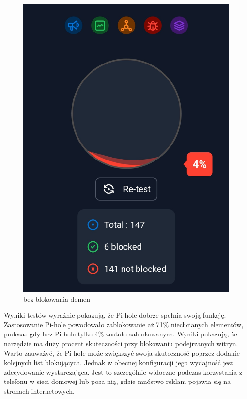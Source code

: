 \documentclass{article}
\begin{document}
\begin{figure}[H]
\begin{minipage}{0.5\textwidth}
    \includegraphics[scale=0.2]{bezBloka1.jpg}
    \caption{bez blokowania domen}
  \end{minipage}
\end{figure}

Wyniki testów wyraźnie pokazują, że Pi-hole dobrze spełnia swoją funkcję. Zastosowanie Pi-hole powodowało zablokowanie aż 71\% niechcianych elementów, podczas gdy bez Pi-hole tylko 4\% zostało zablokowanych. Wyniki pokazują, że narzędzie ma duży procent skuteczności przy blokowaniu podejrzanych witryn.\\

Warto zauważyć, że Pi-hole może zwiększyć swoja skuteczność poprzez dodanie kolejnych list blokujących. Jednak w obecnej konfiguracji jego wydajność jest zdecydowanie wystarczająca. Jest to szczególnie widoczne podczas korzystania z telefonu w sieci domowej lub poza nią, gdzie mnóstwo reklam pojawia się na stronach internetowych.\\
\end{document}
